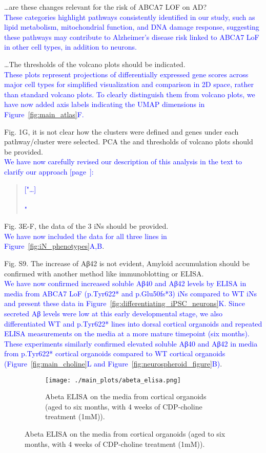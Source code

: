 \dots are these changes relevant for the risk of ABCA7 LOF on AD?\\ 
\textcolor{blue}{These categories highlight pathways consistently identified in our study, such as lipid metabolism, mitochondrial function, and DNA damage response, suggesting these pathways may contribute to Alzheimer’s disease risk linked to ABCA7 LoF in other cell types, in addition to neurons.}

\dots The thresholds of the volcano plots should be indicated.\\ 
\textcolor{blue}{These plots represent projections of differentially expressed gene scores across major cell types for simplified visualization and comparison in 2D space, rather than standard volcano plots. To clearly distinguish them from volcano plots, we have now added axis labels indicating the UMAP dimensions in Figure~\ref{fig:main_atlas}F.}

Fig. 1G, it is not clear how the clusters were defined and genes under each pathway/cluster were selected. PCA the and thresholds of volcano plots should be provided.\\
\textcolor{blue}{We have now carefully revised our description of this analysis in the text to clarify our approach [page~\pageref{quoteF-label}]:}
\begin{quote}
	\textcolor{blue}{["\dots]} \quoteF\\\\
	\quoteG\textcolor{blue}{"}
\end{quote}

Fig. 3E-F, the data of the 3 iNs should be provided.\\
\textcolor{blue}{We have now included the data for all three lines in Figure~\ref{fig:iN_phenotypes}A,B}.

Fig. S9. The increase of Aβ42 is not evident, Amyloid accumulation should be confirmed with another method like immunoblotting or ELISA.\\
\textcolor{blue}{We have now confirmed increased soluble Aβ40 and Aβ42 levels by ELISA in media from ABCA7 LoF (p.Tyr622* and p.Glu50fs*3) iNs compared to WT iNs and present these data in Figure~\ref{fig:differentiating_iPSC_neurons}K. Since secreted Aβ levels were low at this early developmental stage, we also differentiated WT and p.Tyr622* lines into dorsal cortical organoids and repeated ELISA measurements on the media at a more mature timepoint (six months). These experiments similarly confirmed elevated soluble Aβ40 and Aβ42 in media from p.Tyr622* cortical organoids compared to WT cortical organoids (Figure~\ref{fig:main_choline}L and Figure~\ref{fig:neurospheroid_figure}B)}.
\begin{figure}[H] 
	\centering
	\begin{subfigure}[t]{.6\textwidth}
		\caption{Abeta ELISA on the media from cortical organoids (aged to six months, with 4 weeks of CDP-choline treatment (1mM)).}
		\texttt{[image: ./main\_plots/abeta\_elisa.png]}        
	\end{subfigure}  
\end{figure}

